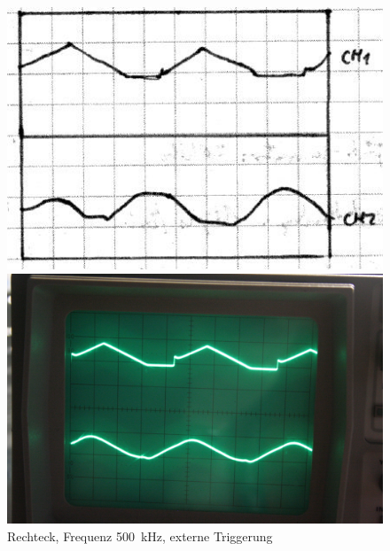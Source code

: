 \begin{figure}
	\centering
	\begin{minipage}{.45\linewidth}
	\includegraphics[width=\linewidth]{Skizzen/IMG_0779-1500.jpg}
	\end{minipage}
	\hfill
	\begin{minipage}{.45\linewidth}
	\includegraphics[width=\linewidth]{Fotos/IMG_0779-1500.jpg}
	\end{minipage}
	\caption{%
		Rechteck, Frequenz \SI{500}{\kilo\hertz},
		externe Triggerung
	}
	\label{fig:0779}
\end{figure}

\IfFileExists{\bibliographyfile}{
	
}{}



